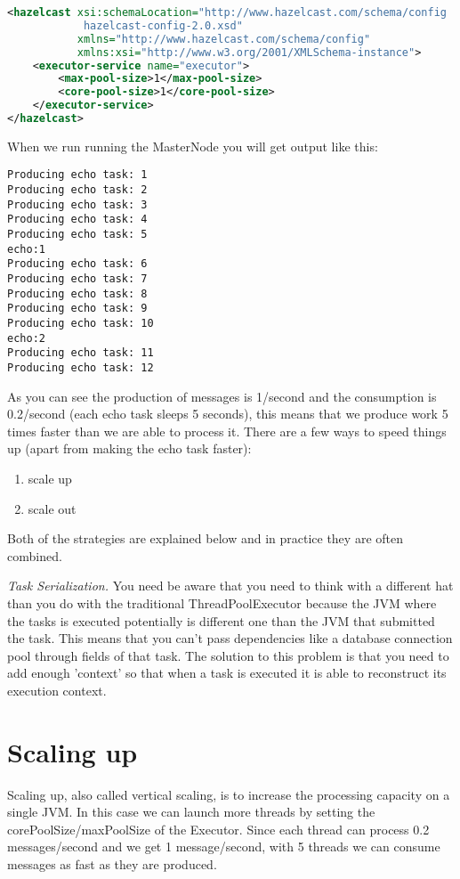 \begin{lstlisting}[language=xml]
<hazelcast xsi:schemaLocation="http://www.hazelcast.com/schema/config
            hazelcast-config-2.0.xsd"
           xmlns="http://www.hazelcast.com/schema/config"
           xmlns:xsi="http://www.w3.org/2001/XMLSchema-instance">
    <executor-service name="executor">
        <max-pool-size>1</max-pool-size>
        <core-pool-size>1</core-pool-size>
    </executor-service>
</hazelcast>
\end{lstlisting}

When we run running the MasterNode you will get output like this:
\begin{verbatim}
Producing echo task: 1
Producing echo task: 2
Producing echo task: 3
Producing echo task: 4
Producing echo task: 5
echo:1
Producing echo task: 6
Producing echo task: 7
Producing echo task: 8
Producing echo task: 9
Producing echo task: 10
echo:2
Producing echo task: 11
Producing echo task: 12	
\end{verbatim}

As you can see the production of messages is 1/second and the consumption is 0.2/second (each echo task sleeps 5 seconds), this means that we produce work 5 times faster than we are able to process it. There are a few ways to speed things up (apart from making the echo task faster):
\begin{enumerate}
\item scale up 
\item scale out
\end{enumerate}
Both of the strategies are explained below and in practice they are often combined. 

\emph{Task Serialization.} You need be aware that you need to think with a different hat than you do with the traditional ThreadPoolExecutor because the JVM where the tasks is executed potentially is different one than the JVM that submitted the task. This means that you can't pass dependencies like a database connection pool through fields of that task. The solution to this problem is that you need to add enough 'context' so that when a task is executed it is able to reconstruct its execution context.

\section{Scaling up}
Scaling up, also called vertical scaling, is to increase the processing capacity on a single JVM. In this case we can launch more threads by setting the corePoolSize/maxPoolSize of the Executor. Since each thread can process 0.2 messages/second and we get 1 message/second, with 5 threads we can consume messages as fast as they are produced.

